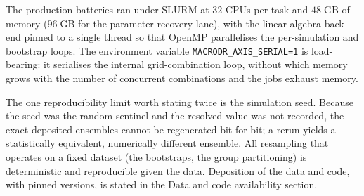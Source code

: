 The production batteries ran under SLURM at $32$ CPUs per task and $48\;\mathrm{GB}$
of memory ($96\;\mathrm{GB}$ for the parameter-recovery lane), with the linear-algebra
back end pinned to a single thread so that OpenMP parallelises the per-simulation and
bootstrap loops. The environment variable \texttt{MACRODR\_AXIS\_SERIAL=1} is
load-bearing: it serialises the internal grid-combination loop, without which memory
grows with the number of concurrent combinations and the jobs exhaust memory.

The one reproducibility limit worth stating twice is the simulation seed. Because the
seed was the random sentinel and the resolved value was not recorded, the exact
deposited ensembles cannot be regenerated bit for bit; a rerun yields a statistically
equivalent, numerically different ensemble. All resampling that operates on a fixed
dataset (the bootstraps, the group partitioning) is deterministic and reproducible
given the data. Deposition of the data and code, with pinned versions, is stated in
the Data and code availability section.
